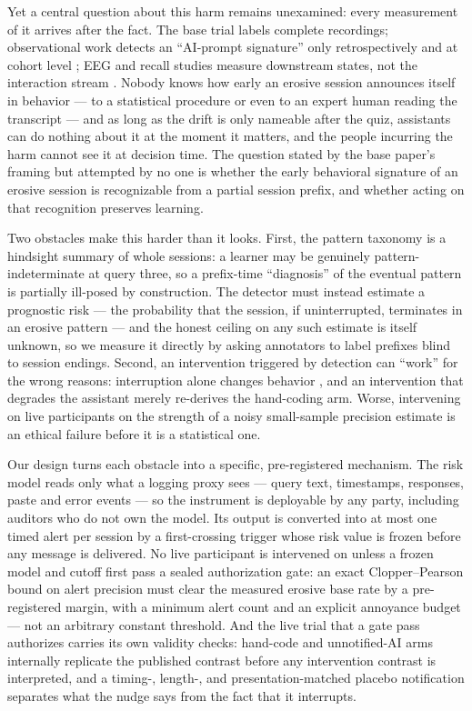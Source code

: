 \documentclass[11pt]{article}
\begin{document}
Yet a central question about this harm remains unexamined: every measurement of it arrives after the fact. The base trial labels complete recordings; observational work detects an ``AI-prompt signature'' only retrospectively and at cohort level \citep{yao2026scaffold}; EEG and recall studies measure downstream states, not the interaction stream \citep{kosmyna2025brain}. Nobody knows how early an erosive session announces itself in behavior --- to a statistical procedure or even to an expert human reading the transcript --- and as long as the drift is only nameable after the quiz, assistants can do nothing about it at the moment it matters, and the people incurring the harm cannot see it at decision time. The question stated by the base paper's framing but attempted by no one is whether the early behavioral signature of an erosive session is recognizable from a partial session prefix, and whether acting on that recognition preserves learning.

Two obstacles make this harder than it looks. First, the pattern taxonomy is a hindsight summary of whole sessions: a learner may be genuinely pattern-indeterminate at query three, so a prefix-time ``diagnosis'' of the eventual pattern is partially ill-posed by construction. The detector must instead estimate a prognostic risk --- the probability that the session, if uninterrupted, terminates in an erosive pattern --- and the honest ceiling on any such estimate is itself unknown, so we measure it directly by asking annotators to label prefixes blind to session endings. Second, an intervention triggered by detection can ``work'' for the wrong reasons: interruption alone changes behavior \citep{bucinca2021trust}, and an intervention that degrades the assistant merely re-derives the hand-coding arm. Worse, intervening on live participants on the strength of a noisy small-sample precision estimate is an ethical failure before it is a statistical one.

Our design turns each obstacle into a specific, pre-registered mechanism. The risk model reads only what a logging proxy sees --- query text, timestamps, responses, paste and error events --- so the instrument is deployable by any party, including auditors who do not own the model. Its output is converted into at most one timed alert per session by a first-crossing trigger whose risk value is frozen before any message is delivered. No live participant is intervened on unless a frozen model and cutoff first pass a sealed authorization gate: an exact Clopper--Pearson bound \citep{clopper1934use} on alert precision must clear the measured erosive base rate by a pre-registered margin, with a minimum alert count and an explicit annoyance budget --- not an arbitrary constant threshold. And the live trial that a gate pass authorizes carries its own validity checks: hand-code and unnotified-AI arms internally replicate the published contrast before any intervention contrast is interpreted, and a timing-, length-, and presentation-matched placebo notification separates what the nudge says from the fact that it interrupts.
\end{document}

